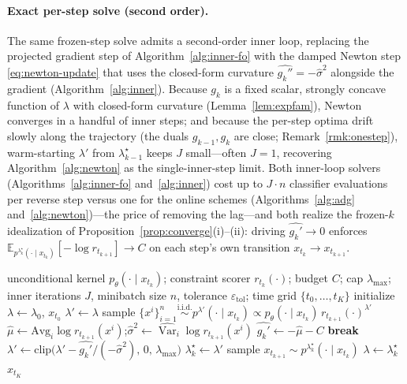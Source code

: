 \documentclass{article}
\DeclareMathOperator{\Var}{Var}
\newcommand{\E}{\mathbb{E}}
\newcommand{\eps}{\varepsilon}
\newcommand{\lstar}{\lambda^{\star}}
\begin{document}
\paragraph{Exact per-step solve (second order).}
The same frozen-step solve admits a second-order inner loop, replacing the projected gradient step of Algorithm~\ref{alg:inner-fo} with the damped Newton step \eqref{eq:newton-update} that uses the closed-form curvature $\widehat{g_k''}=-\widehat\sigma^2$ alongside the gradient (Algorithm~\ref{alg:inner}). Because $g_k$ is a fixed scalar, strongly concave function of $\lambda$ with closed-form curvature (Lemma~\ref{lem:expfam}), Newton converges in a handful of inner steps; and because the per-step optima drift slowly along the trajectory (the duals $g_{k-1},g_k$ are close; Remark~\ref{rmk:onestep}), warm-starting $\lambda'$ from $\lstar_{k-1}$ keeps $J$ small---often $J{=}1$, recovering Algorithm~\ref{alg:newton} as the single-inner-step limit. Both inner-loop solvers (Algorithms~\ref{alg:inner-fo} and~\ref{alg:inner}) cost up to $J\cdot n$ classifier evaluations per reverse step versus one for the online schemes (Algorithms~\ref{alg:adg} and~\ref{alg:newton})---the price of removing the lag---and both realize the frozen-$k$ idealization of Proposition~\ref{prop:converge}(i)--(ii): driving $\widehat{g_k'}\to0$ enforces $\E_{p^{\lstar_k}(\cdot\mid x_{t_k})}[-\log r_{t_{k+1}}]\to C$ on each step's own transition $x_{t_k}\to x_{t_{k+1}}$.

\begin{algorithm}[t]
\caption{Adaptive Dual Guidance with exact per-step solve (inner loop)}
\label{alg:inner}
\begin{algorithmic}[1]
\Require unconditional kernel $p_\theta(\cdot\mid x_{t_k})$; constraint scorer $r_{t_k}(\cdot)$; budget $C$; cap $\lambda_{\max}$; inner iterations $J$, minibatch size $n$, tolerance $\eps_{\mathrm{tol}}$; time grid $\{t_0,\dots,t_K\}$
\State initialize $\lambda\gets\lambda_0$, $x_{t_0}$
  \State $\lambda'\gets\lambda$ 
   
    \State sample $\{x^i\}_{i=1}^n\stackrel{\text{i.i.d.}}{\sim}p^{\lambda'}(\cdot\mid x_{t_k})\propto p_\theta(\cdot\mid x_{t_k})\,r_{t_{k+1}}(\cdot)^{\lambda'}$
    \State $\widehat\mu\gets\mathrm{Avg}_i\log r_{t_{k+1}}(x^i)$;\quad $\widehat\sigma^2\gets\widehat{\Var}_i\log r_{t_{k+1}}(x^i)$
    \State $\widehat{g_k'}\gets-\widehat\mu-C$ 
    \If{$|\widehat{g_k'}|\le\eps_{\mathrm{tol}}$} \textbf{break} \EndIf
    \State $\lambda'\gets\mathrm{clip}\big(\lambda'-\widehat{g_k'}/(-\widehat\sigma^2),\,0,\,\lambda_{\max}\big)$ 
  \EndFor
  \State $\lstar_k\gets\lambda'$ 
  \State sample $x_{t_{k+1}}\sim p^{\lstar_k}(\cdot\mid x_{t_k})$ 
  \State $\lambda\gets\lstar_k$
\EndFor
\State \Return $x_{t_K}$
\end{algorithmic}
\end{algorithm}
\end{document}
